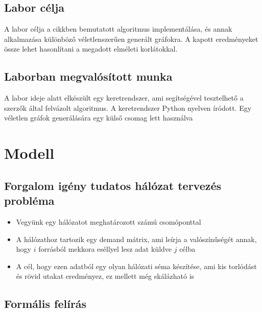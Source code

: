 \documentclass[12pt]{report}
\begin{document}
\section{Labor célja}

A labor célja a cikkben\cite{avin_demand-aware_nodate} bemutatott algoritmus implementálása, és annak alkalmazása különböző véletlenszerűen generált gráfokra. 
A kapott eredményeket össze lehet hasonlítani a megadott elméleti korlátokkal.

\section{Laborban megvalósított munka}

A labor ideje alatt elkészült egy keretrendszer, ami segítségével tesztelhető a szerzők által felvázolt algoritmus. 
A keretrendszer Python \cite{noauthor_python_nodate} nyelven íródott.
Egy véletlen gráfok generálására egy külső csomag lett használva \cite{noauthor_networkx_nodate}

\chapter{Modell}

\section{Forgalom igény tudatos hálózat tervezés probléma}

\begin{itemize}
	\item Vegyünk egy hálózatot meghatározott számú csomóponttal
	\item A hálózathoz tartozik egy demand mátrix, ami leírja a valószínűségét annak, hogy $i$ forrásból mekkora eséllyel lesz adat küldve $j$ célba
	\item A cél, hogy ezen adatból egy olyan hálózati séma készítése, ami kis torlódást és rövid utakat eredményez, ez mellett még skálázható is
\end{itemize}

\section{Formális felírás}
\end{document}
